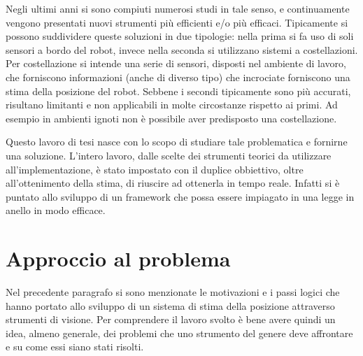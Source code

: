 Negli ultimi anni si sono compiuti numerosi studi in tale senso, e continuamente vengono presentati nuovi strumenti più efficienti e/o più efficaci. Tipicamente si possono suddividere queste soluzioni in due tipologie: nella prima si fa uso di soli sensori a bordo del robot, invece nella seconda si utilizzano sistemi a costellazioni. Per costellazione si intende una serie di sensori, disposti nel ambiente di lavoro, che forniscono informazioni (anche di diverso tipo) che incrociate forniscono una stima della posizione del robot. Sebbene i secondi tipicamente sono più accurati, risultano limitanti e non applicabili in molte circostanze rispetto ai primi. Ad esempio in ambienti ignoti non è possibile aver predisposto una costellazione.

Questo lavoro di tesi nasce con lo scopo di studiare tale problematica e fornirne una soluzione. L'intero lavoro, dalle scelte dei strumenti teorici da utilizzare all'implementazione, è stato impostato con il duplice obbiettivo, oltre all'ottenimento della stima, di riuscire ad ottenerla in tempo reale. Infatti si è puntato allo sviluppo di un framework che possa essere impiagato in una legge in anello in modo efficace.  

 

\section{Approccio al problema}
\label{sec:approccio}
Nel precedente paragrafo si sono menzionate le motivazioni e i passi logici che hanno portato allo sviluppo di un sistema di stima della posizione attraverso strumenti di visione. Per comprendere il lavoro svolto è bene avere quindi un idea, almeno generale, dei problemi che uno strumento del genere deve affrontare e su come essi siano stati risolti. 

